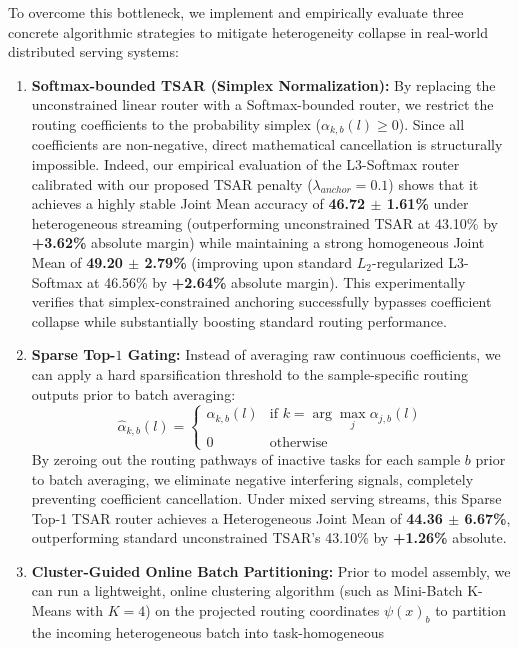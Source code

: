 To overcome this bottleneck, we implement and empirically evaluate three concrete algorithmic
strategies to mitigate heterogeneity collapse in real-world distributed serving systems:
\begin{enumerate}
  \item \textbf{Softmax-bounded TSAR (Simplex Normalization):} By replacing the unconstrained
linear router with a Softmax-bounded router, we restrict the routing coefficients to the probability
simplex ($\alpha_{k, b}(l) \ge 0$). Since all coefficients are non-negative, direct mathematical
cancellation is structurally impossible. Indeed, our empirical evaluation of the L3-Softmax router
calibrated with our proposed TSAR penalty ($\lambda_{anchor}=0.1$) shows that it achieves a highly
stable Joint Mean accuracy of \textbf{46.72 $\pm$ 1.61\%} under heterogeneous streaming
(outperforming unconstrained TSAR at 43.10\% by \textbf{+3.62\%} absolute margin) while maintaining
a strong homogeneous Joint Mean of \textbf{49.20 $\pm$ 2.79\%} (improving upon standard
$L_2$-regularized L3-Softmax at 46.56\% by \textbf{+2.64\%} absolute margin). This experimentally
verifies that simplex-constrained anchoring successfully bypasses coefficient collapse while
substantially boosting standard routing performance.
  \item \textbf{Sparse Top-$1$ Gating:} Instead of averaging raw continuous coefficients, we can
apply a hard sparsification threshold to the sample-specific routing outputs prior to batch
averaging:
  \begin{equation}
  \hat{\alpha}_{k, b}(l) = \begin{cases} \alpha_{k, b}(l) & \text{if } k = \arg\max_{j} \alpha_{j,
b}(l) \\ 0 & \text{otherwise} \end{cases}
  \label{eq:top1_gating}
  \end{equation}
  By zeroing out the routing pathways of inactive tasks for each sample $b$ prior to batch
averaging, we eliminate negative interfering signals, completely preventing coefficient
cancellation. Under mixed serving streams, this Sparse Top-1 TSAR router achieves a Heterogeneous
Joint Mean of \textbf{44.36 $\pm$ 6.67\%}, outperforming standard unconstrained TSAR's 43.10\% by
\textbf{+1.26\%} absolute.
  \item \textbf{Cluster-Guided Online Batch Partitioning:} Prior to model assembly, we can run a
lightweight, online clustering algorithm (such as Mini-Batch K-Means with $K=4$) on the projected
routing coordinates $\psi(x)_b$ to partition the incoming heterogeneous batch into task-homogeneous

\end{enumerate}
